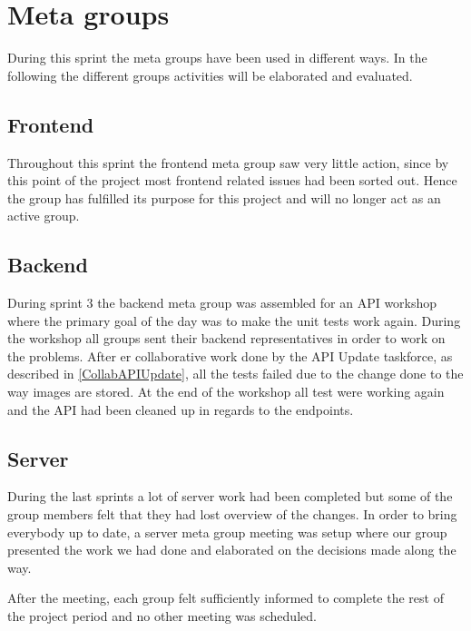 \section{Meta groups}
During this sprint the meta groups have been used in different ways. 
In the following the different groups activities will be elaborated and evaluated.

\subsection{Frontend}
Throughout this sprint the frontend meta group saw very little action, since by this point of the project most frontend related issues had been sorted out. 
Hence the group has fulfilled its purpose for this project and will no longer act as an active group.

\subsection{Backend}
During sprint 3 the backend meta group was assembled for an API workshop where the primary goal of the day was to make the unit tests work again.
During the workshop all groups sent their backend representatives in order to work on the problems.
After er collaborative work done by the API Update taskforce, as described in \autoref{CollabAPIUpdate}, all the tests failed due to the change done to the way images are stored. 
At the end of the workshop all test were working again and the API had been cleaned up in regards to the endpoints. 

\subsection{Server}
During the last sprints a lot of server work had been completed but some of the group members felt that they had lost overview of the changes. 
In order to bring everybody up to date, a server meta group meeting was setup where our group presented the work we had done and elaborated on the decisions made along the way. 

After the meeting, each group felt sufficiently informed to complete the rest of the project period and no other meeting was scheduled.
